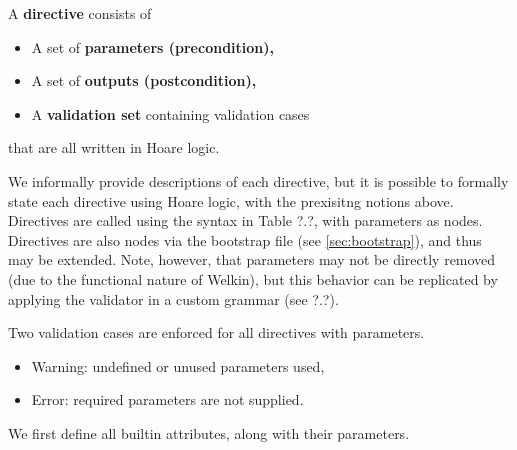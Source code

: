 \begin{itemize}
\begin{definition}
A \textbf{directive} consists of
\begin{itemize}
  \item A set of \textbf{parameters (precondition),}
  \item A set of \textbf{outputs (postcondition),}
  \item A \textbf{validation set} containing validation cases
\end{itemize}
that are all written in Hoare logic.
\end{definition}
We informally provide descriptions of each directive, but it is possible to formally state each directive using Hoare logic, with the prexisitng notions above. Directives are called using the syntax in Table ?.?, with parameters as nodes. Directives are also nodes via the bootstrap file (see \ref{sec:bootstrap}), and thus may be extended. Note, however, that parameters may not be directly removed (due to the functional nature of Welkin), but this behavior can be replicated by applying the validator in a custom grammar (see ?.?).

Two validation cases are enforced for all directives with parameters.
\begin{itemize}
  \item Warning: undefined or unused parameters used,
  \item Error: required parameters are not supplied.
\end{itemize}

We first define all builtin attributes, along with their parameters.


\end{itemize}
